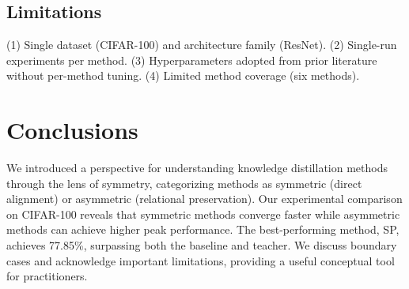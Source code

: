 \documentclass[symmetry,article,submit,moreauthors]{Definitions/mdpi}
\begin{document}
\subsection{Limitations}

(1) Single dataset (CIFAR-100) and architecture family (ResNet). (2) Single-run experiments per method. (3) Hyperparameters adopted from prior literature without per-method tuning. (4) Limited method coverage (six methods).

\section{Conclusions}

We introduced a perspective for understanding knowledge distillation methods through the lens of symmetry, categorizing methods as symmetric (direct alignment) or asymmetric (relational preservation). Our experimental comparison on CIFAR-100 reveals that symmetric methods converge faster while asymmetric methods can achieve higher peak performance. The best-performing method, SP, achieves 77.85\%, surpassing both the baseline and teacher. We discuss boundary cases and acknowledge important limitations, providing a useful conceptual tool for practitioners.

\vspace{6pt}







\end{document}
